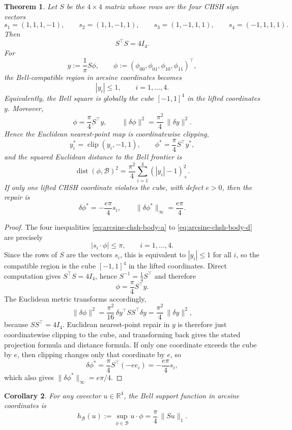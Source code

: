 \documentclass[11pt]{article}
\numberwithin{equation}{section}
\theoremstyle{thmcompact}
\newtheorem{theorem}{Theorem}[section]
\newtheorem{corollary}[theorem]{Corollary}
\theoremstyle{remark}
\begin{document}
\begin{theorem}\label{thm:bell-cube-app}
Let $S$ be the $4\times 4$ matrix whose rows are the four CHSH sign vectors
\[
s_1=(1,1,1,-1),\qquad s_2=(1,1,-1,1),\qquad s_3=(1,-1,1,1),\qquad s_4=(-1,1,1,1).
\]
Then
\[
S^\top S=4I_4.
\]
For
\[
y:=\frac{1}{\pi}S\phi,
\qquad
\phi:=(\phi_{00},\phi_{01},\phi_{10},\phi_{11})^\top,
\]
the Bell-compatible region in arcsine coordinates becomes
\[
|y_i|\le 1,
\qquad i=1,\dots,4.
\]
Equivalently, the Bell square is globally the cube $[-1,1]^4$ in the lifted coordinates $y$. Moreover,
\[
\phi=\frac{\pi}{4}S^\top y,
\qquad
\|\delta\phi\|^2=\frac{\pi^2}{4}\,\|\delta y\|^2.
\]
Hence the Euclidean nearest-point map is coordinatewise clipping,
\[
y_i^\ast=\operatorname{clip}(y_i,-1,1),
\qquad
\phi^\ast=\frac{\pi}{4}S^\top y^\ast,
\]
and the squared Euclidean distance to the Bell frontier is
\[
\operatorname{dist}(\phi,\mathcal B)^2
=\frac{\pi^2}{4}\sum_{i=1}^4 (|y_i|-1)_+^2.
\]
If only one lifted CHSH coordinate violates the cube, with defect $e>0$, then the repair is
\[
\delta\phi^\ast=-\frac{e\pi}{4}s_i,
\qquad
\|\delta\phi^\ast\|_\infty=\frac{e\pi}{4}.
\]
\end{theorem}

\begin{proof}
The four inequalities \eqref{eq:arcsine-chsh-body-a} to \eqref{eq:arcsine-chsh-body-d} are precisely
\[
|s_i\cdot \phi|\le \pi,
\qquad i=1,\dots,4.
\]
Since the rows of $S$ are the vectors $s_i$, this is equivalent to $|y_i|\le 1$ for all $i$, so the compatible region is the cube $[-1,1]^4$ in the lifted coordinates. Direct computation gives $S^\top S=4I_4$, hence $S^{-1}=\frac14 S^\top$ and therefore
\[
\phi=\frac{\pi}{4}S^\top y.
\]
The Euclidean metric transforms accordingly,
\[
\|\delta\phi\|^2
=\frac{\pi^2}{16}\,\delta y^\top SS^\top \delta y
=\frac{\pi^2}{4}\,\|\delta y\|^2,
\]
because $SS^\top=4I_4$. Euclidean nearest-point repair in $y$ is therefore just coordinatewise clipping to the cube, and transforming back gives the stated projection formula and distance formula. If only one coordinate exceeds the cube by $e$, then clipping changes only that coordinate by $e$, so
\[
\delta\phi^\ast=\frac{\pi}{4}S^\top(-e e_i)=-\frac{e\pi}{4}s_i,
\]
which also gives $\|\delta\phi^\ast\|_\infty=e\pi/4$.
\end{proof}

\begin{corollary}\label{cor:bell-support-app}
For any covector $u\in\mathbb R^4$, the Bell support function in arcsine coordinates is
\[
h_{\mathcal B}(u):=\sup_{\phi\in\mathcal B}u\cdot\phi
=\frac{\pi}{4}\,\|Su\|_1.
\]
\end{corollary}
\end{document}
